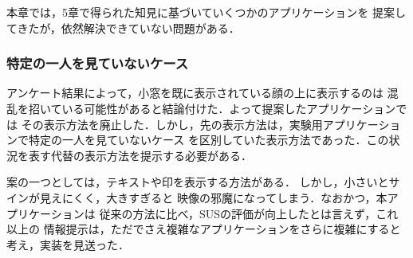 \begin{comment}
\begin{itemize}
  \item 6-2で，様々な顔の表示方法を提案した．
  \item コロナ禍の影響で十分な実験を行うことが出来なかった
  \item 提案したアプリケーションを用いて，十分な実験を行い，比較を行うことで，
  最適な表示方法を決定することが今後の課題である
  \item 一方で解決できていない問題も存在する
  \item 小窓が表示される際に，突然表示されて使用者が驚いてしまう
  \item 複数の人間に話しかけている場合の顔や小窓の表示方法
  \item 今後の研究でそれらの問題を解決する方法を模索していく
  \item また，今回のアプリケーションは個人対複数人といったユースケースに限られている
  \item 個人の参加者が複数人いた場合，OmniEyeBall上での表示をどのようにするかという問題がある．
  \item 例えば，OmniEyeBall側で，現在映したい人物を選択できるようにすれば，今回のシステムをそのまま活用できる
  \item 一方で，会話にPC使用者が複数人参加している場合には，同時に映すことが出来ない
  \item このようなユースケースにも対応していく方法も検討する必要がある
\end{itemize}
\end{comment}
本章では，5章で得られた知見に基づいていくつかのアプリケーションを
提案してきたが，依然解決できていない問題がある．

\subsubsection*{特定の一人を見ていないケース}
アンケート結果によって，小窓を既に表示されている顔の上に表示するのは
混乱を招いている可能性があると結論付けた．よって提案したアプリケーションでは
その表示方法を廃止した．しかし，先の表示方法は，実験用アプリケーションで特定の一人を見ていないケース
を区別していた表示方法であった．この状況を表す代替の表示方法を提示する必要がある．

案の一つとしては，テキストや印を表示する方法がある．
しかし，小さいとサインが見えにくく，大きすぎると
映像の邪魔になってしまう．なおかつ，本アプリケーションは
従来の方法に比べ，SUSの評価が向上したとは言えず，これ以上の
情報提示は，ただでさえ複雑なアプリケーションをさらに複雑にすると
考え，実装を見送った．

